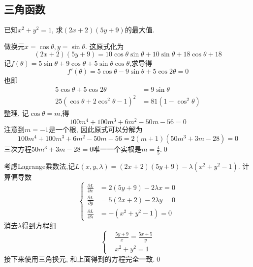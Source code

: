 \clearpage
\subsection{三角函数}
\begin{example}
    已知$x^2+y^2=1$, 求$(2x+2)(5y+9)$的最大值.
\end{example}
\begin{jie}
    \begin{way1}[三角换元]
        做换元\(x=\cos\theta,y=\sin\theta\).
        这原式化为
        \[(2x+2)(5y+9)=10\cos\theta\sin\theta+10\sin\theta+18\cos\theta+18\]
        记\(f(\theta)=5\sin\theta+9\cos\theta+5\sin\theta\cos\theta\),求导得  
        \[f'(\theta)=5\cos\theta-9\sin\theta+5\cos2\theta=0\]
        也即
        \begin{align*}
            5\cos\theta+5\cos2\theta&=9\sin\theta\\
            25(\cos\theta+2\cos^2\theta-1)^2&=81(1-\cos^2\theta)
        \end{align*}
        整理, 记\(\cos\theta=m\),得
        \[100m^4+100m^3+6m^2-50m-56=0\]
        注意到\(m=-1\)是一个根, 因此原式可以分解为
        \[100m^4+100m^3+6m^2-50m-56=2(m+1)(50m^3+3m-28)=0\]
        三次方程\(50m^3+3m-28=0\)唯一一个实根是\(m=\frac{4}{5}\).\qed
    \end{way1}
    \begin{way2}
        考虑Lagrange乘数法,记\(L(x,y,\lambda)=(2x+2)(5y+9)-\lambda(x^2+y^2-1)\).
        计算偏导数
        \[\left\{
            \begin{aligned}
                \frac{\partial L}{\partial x}&=2(5y+9)-2\lambda x=0\\
                 \frac{\partial L}{\partial y}&=5(2x+2)-2\lambda y=0\\
                  \frac{\partial L}{\partial \lambda}&=-(x^2+y^2-1)=0
            \end{aligned}
        \right.\]
        消去\(\lambda\)得到方程组
        \[\left\{
            \begin{aligned}
                &\frac{5y+9}{x}=\frac{5x+5}{y}\\
                &x^2+y^2=1
            \end{aligned}
        \right.\]
        接下来使用三角换元, 和上面得到的方程完全一致.\qed
    \end{way2}
\end{jie}

